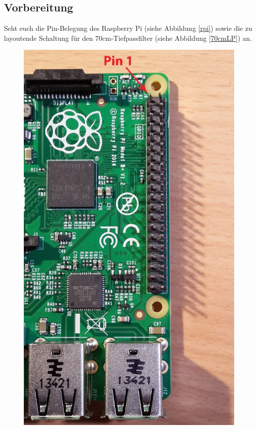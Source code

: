 \subsection*{Vorbereitung}

Seht euch die Pin-Belegung des Raspberry Pi (siehe Abbildung \ref{rpi}) sowie
die zu layoutende Schaltung für den 70cm-Tiefpassfilter (siehe Abbildung
\ref{70cmLP}) an.

\begin{figure}[H]
    \centering
    \includegraphics[height=0.4\textheight]{Schwingkreis/Bilder/B_plus_hdr_sm.jpg}

\end{figure}
